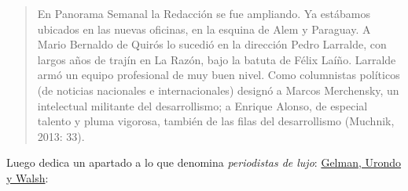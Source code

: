 {\begin{quote}
En Panorama Semanal la Redacción se fue ampliando. Ya estábamos ubicados en las nuevas oficinas, en la esquina de Alem y Paraguay. A Mario Bernaldo de Quirós lo sucedió en la dirección Pedro Larralde, con largos años de trajín en La Razón, bajo la batuta de Félix Laíño. Larralde armó un equipo profesional de muy buen nivel. Como columnistas políticos (de noticias nacionales e internacionales) designó a Marcos Merchensky, un intelectual militante del desarrollismo; a Enrique Alonso, de especial talento y pluma vigorosa, también de las filas del desarrollismo (Muchnik, 2013: 33).
\end{quote}

Luego dedica un apartado a lo que denomina \emph{periodistas de lujo}: \protect\hyperlink{_bookmark8}{Gelman, Urondo y Walsh}:

}

